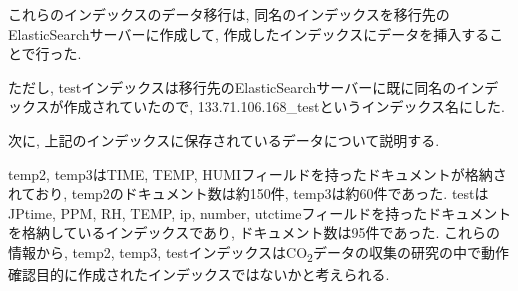 これらのインデックスのデータ移行は, 同名のインデックスを移行先のElasticSearchサーバーに作成して, 作成したインデックスにデータを挿入することで行った.

ただし, testインデックスは移行先のElasticSearchサーバーに既に同名のインデックスが作成されていたので, 133.71.106.168\_testというインデックス名にした.

次に, 上記のインデックスに保存されているデータについて説明する.

temp2, temp3はTIME, TEMP, HUMIフィールドを持ったドキュメントが格納されており, temp2のドキュメント数は約150件, temp3は約60件であった.
testはJPtime, PPM, RH, TEMP, ip, number, utctimeフィールドを持ったドキュメントを格納しているインデックスであり, ドキュメント数は95件であった.
これらの情報から, temp2, temp3, testインデックスはCO\textsubscript{2}データの収集の研究の中で動作確認目的に作成されたインデックスではないかと考えられる.



